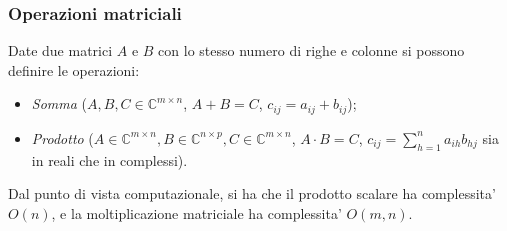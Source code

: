 \documentclass[a4paper,11pt]{article}
\begin{document}
\subsubsection{Operazioni matriciali}
Date due matrici $A$ e $B$ con lo stesso numero di righe e colonne si possono definire le operazioni:
\begin{itemize}
	\item \textit{Somma} ($A, B, C \in \mathbb{C}^{m \times n}$, $A + B = C$, $c_{ij} = a_{ij} + b_{ij}$);
	\item \textit{Prodotto} ($A \in \mathbb{C}^{m \times n}, B \in \mathbb{C}^{n \times p}, C \in \mathbb{C}^{m \times n}$, $A \cdot B = C$, $c_{ij} = \sum_{h = 1}^n a_{ih} b_{hj}$ sia in reali che in complessi). 
\end{itemize}

\par\smallskip

Dal punto di vista computazionale, si ha che il prodotto scalare ha complessita' $O(n)$, e la moltiplicazione matriciale ha complessita' $O(m, n)$.
\end{document}

